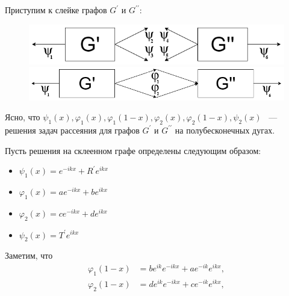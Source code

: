 \documentclass[a4 paper, 12 pt]{extarticle}
\begin{document}
   Приступим к слейке графов $G^\prime$ и $G^{\prime \prime}$:
   \begin{figure}[!htb]
   	\centering
   	\includegraphics[scale=0.54]{skleika2.png} \\
   	\includegraphics[scale=0.45]{skleika3.png}
   \end{figure}

   Ясно, что $\psi_1\left(x\right), \varphi_1\left(x\right), \varphi_1\left(1-x\right), \varphi_2\left(x\right), \varphi_2\left(1-x\right), \psi_2\left(x\right)$ ~--- решения задач рассеяния для графов  $G^\prime$ и $G^{\prime \prime}$ на полубесконечных дугах.
   
   Пусть решения на склеенном графе определены следующим образом:
   \begin{itemize}
   	\item $ \psi_1\left(x\right) = e^{-ikx} + R^\prime e^{ikx} $
   	\item $ \varphi_1\left(x\right)  = a e^{-ikx} + b e^{ikx} $
   	\item $ \varphi_2\left(x\right) = c e^{-ikx} + d e^{ikx} $
   	\item $ \psi_2\left(x\right) = T^\prime e^{ikx}$
   \end{itemize}
   Заметим, что
   \[
   \begin{aligned}
   \varphi_1\left(1-x\right) &= b e^{ik} e^{-ikx} + a e^{-ik} e^{ikx}, \\
   \varphi_2\left(1-x\right) &= d e^{ik} e^{-ikx} + c e^{-ik} e^{ikx},
   \end{aligned}\]
   
\end{document}
